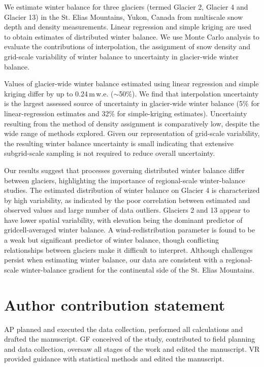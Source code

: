\documentclass[review,oneside, letterpaper]{igs}
\begin{document}
We estimate winter balance for three glaciers (termed Glacier 2, Glacier 4 and Glacier 13) in the St. Elias Mountains, Yukon, Canada from multiscale snow depth and density measurements. Linear regression and simple kriging are used to obtain estimates of distributed winter balance. We use Monte Carlo analysis to evaluate the contributions of interpolation, the assignment of snow density and grid-scale variability of winter balance to  uncertainty in glacier-wide winter balance. 

Values of glacier-wide winter balance estimated using linear regression and simple kriging differ by up to 0.24\,m\,w.e. ($\sim$50\%). We find that interpolation uncertainty is the largest assessed source of uncertainty in glacier-wide winter balance (5\% for linear-regression estimates and 32\% for simple-kriging estimates). Uncertainty resulting from the method of density assignment is comparatively low, despite the wide range of methods explored. Given our representation of grid-scale variability, the resulting winter balance uncertainty is small indicating that extensive subgrid-scale sampling is not required to reduce overall uncertainty. 

Our results suggest that processes governing distributed winter balance differ between glaciers, highlighting the importance of regional-scale winter-balance studies. The estimated distribution of winter balance on Glacier 4 is characterized by high variability, as indicated by the poor correlation between estimated and observed values and large number of data outliers. Glaciers 2 and 13 appear to have lower spatial variability, with elevation being the dominant predictor of gridcell-averaged winter balance. A wind-redistribution parameter is found to be a weak but significant predictor of winter balance, though conflicting relationships between glaciers make it difficult to interpret.
Although challenges persist when estimating winter balance, our data are consistent with a regional-scale winter-balance gradient for the continental side of the St. Elias Mountains. 

\section{Author contribution statement}

AP planned and executed the data collection, performed all calculations and drafted the manuscript. GF conceived of the study, contributed to field planning and data collection, oversaw all stages of the work and edited the manuscript. VR provided guidance with statistical methods and edited the manuscript.
\end{document}
